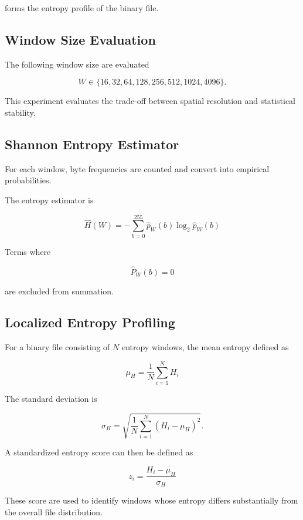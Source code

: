 \documentclass[10pt,letterpaper]{article}
\begin{document}
forms the entropy profile of the binary file.


\subsection{Window Size Evaluation}

The following window size are evaluated

\begin{equation}
    W \in \{16, 32, 64, 128, 256, 512, 1024, 4096\}.
\end{equation}

This experiment evaluates the trade-off between spatial resolution and
statistical stability.


\subsection{Shannon Entropy Estimator}

For each window, byte frequencies are counted and convert into empirical probabilities.

The entropy estimator is

\begin{equation}
    \hat{H}(W) = -\sum_{b=0}^{255}
    \hat{p}_W(b) \log_2
    \hat{p}_W(b)
\end{equation}

Terms where

\[\hat{P}_W(b)=0\]

are excluded from summation.


\subsection{Localized Entropy Profiling}

For a binary file consisting of $N$ entropy windows, the mean entropy defined as

\begin{equation}
    \mu_H = \frac{1}{N} \sum_{i=1}^{N}H_i
\end{equation}

The standard deviation is

\begin{equation}
    \sigma_H = \sqrt{\frac{1}{N} \sum_{i=1}^{N}
    (H_i-\mu_H)^2
    }.
\end{equation}

A standardized entropy score can then be defined as

\begin{equation}
    z_i = \frac{H_i-\mu_H}{\sigma_H}
\end{equation}

These score are used to identify windows whose entropy differs
substantially from the overall file distribution.
\end{document}
